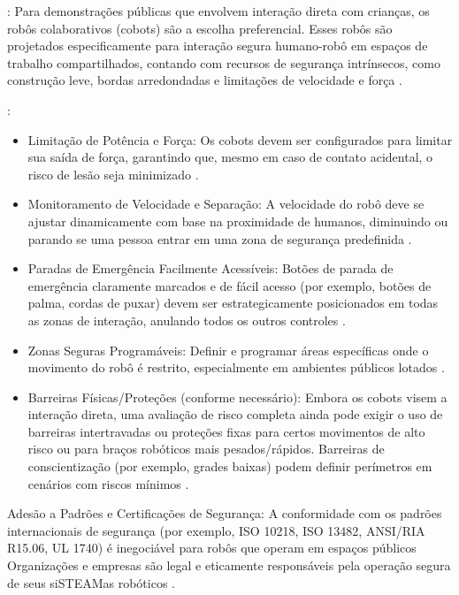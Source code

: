 \documentclass[%
  a4paper,%
  12pt,%
  fleqn,%
  english,%
  brazilian,%
]{article}
\begin{document}
	\begin{description}
		\item [Priorizar Robôs Colaborativos (Cobots)]: Para demonstrações públicas que envolvem interação direta com crianças, os robôs colaborativos (cobots) são a escolha preferencial. Esses robôs são projetados especificamente para interação segura humano-robô em espaços de trabalho compartilhados, contando com recursos de segurança intrínsecos, como construção leve, bordas arredondadas e limitações de velocidade e força \cite{top3dshopDobotMagicianReview2023}.
		
		\item [Implementar Recursos Essenciais de Segurança]:
			\begin{itemize}
				\item Limitação de Potência e Força: Os cobots devem ser configurados para limitar sua saída de força, garantindo que, mesmo em caso de contato acidental, o risco de lesão seja minimizado \cite{wikipediaCobot2025}.
				\item Monitoramento de Velocidade e Separação: A velocidade do robô deve se ajustar dinamicamente com base na proximidade de humanos, diminuindo ou parando se uma pessoa entrar em uma zona de segurança predefinida \cite{wikipediaCobot2025}.
				\item Paradas de Emergência Facilmente Acessíveis: Botões de parada de emergência claramente marcados e de fácil acesso (por exemplo, botões de palma, cordas de puxar) devem ser estrategicamente posicionados em todas as zonas de interação, anulando todos os outros controles \cite{kinovaJacoAssistiveTechnologies2025}.
				\item Zonas Seguras Programáveis: Definir e programar áreas específicas onde o movimento do robô é restrito, especialmente em ambientes públicos lotados \cite{teradyneCollaborativeRobots2025}.
				\item Barreiras Físicas/Proteções (conforme necessário): Embora os cobots visem a interação direta, uma avaliação de risco completa ainda pode exigir o uso de barreiras intertravadas ou proteções fixas para certos movimentos de alto risco ou para braços robóticos mais pesados/rápidos. Barreiras de conscientização (por exemplo, grades baixas) podem definir perímetros em cenários com riscos mínimos \cite{kinovaJacoAssistiveTechnologies2025}.
			\end{itemize}
		\item Adesão a Padrões e Certificações de Segurança: A conformidade com os padrões internacionais de segurança (por exemplo, ISO 10218, ISO 13482, ANSI/RIA R15.06, UL 1740) é inegociável para robôs que operam em espaços públicos \cite{standardBotsCobotSafetyStandards2025} Organizações e empresas são legal e eticamente responsáveis pela operação segura de seus siSTEAMas robóticos \cite{li2023LowCostCableDrivenArm}.

\end{description}
\end{document}
